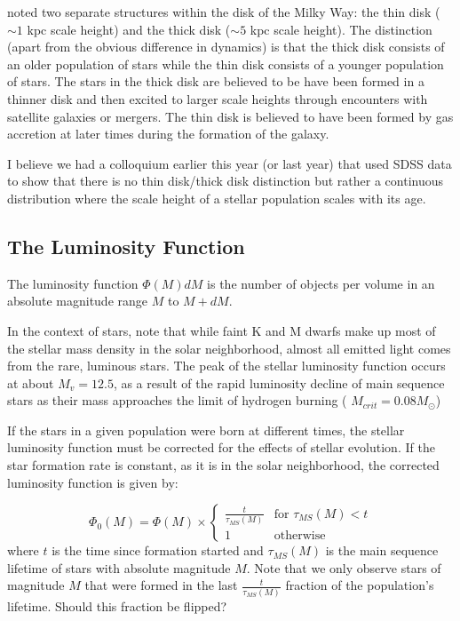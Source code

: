  noted two separate structures within the disk of the
Milky Way: the thin disk ($\sim1$ kpc scale height) and the thick disk
($\sim5$ kpc scale height).  The distinction (apart from the obvious difference in dynamics)
is that the thick disk consists of an older population of stars while the thin disk consists
of a younger population of stars.
The stars in the thick disk are believed to be have been formed in a thinner disk and then
excited to larger scale heights through encounters with satellite galaxies or mergers.
The thin disk is believed to have been formed by gas
accretion at later times during the formation of the galaxy.

I believe we had a colloquium earlier this year (or last year) that used SDSS data to show
that there is no thin disk/thick disk distinction but rather a continuous distribution
where the scale height of a stellar population scales with its age.

\subsection{The Luminosity Function}

The luminosity function $\Phi(M)dM$ is the number of objects per volume in an absolute magnitude range $M$ to $M+dM$. 

In the context of stars, note that while faint K and M dwarfs make up most of
the stellar mass density in the solar neighborhood, almost all emitted light
comes from the rare, luminous stars.
The peak of the stellar luminosity function occurs at about $M_v = 12.5$, as a result of the rapid luminosity decline of main sequence stars as their mass approaches the limit of hydrogen burning ( $M_{crit} = 0.08 M_\odot$)

If the stars in a given population were born at different times, the stellar luminosity function must be corrected for the effects of stellar evolution. If the star formation rate is constant, as it is in the solar neighborhood,  the corrected luminosity function is given by:

 \begin{equation}
\Phi_0(M) = \Phi(M) \times
\begin{cases}
\frac{t}{\tau_{MS}(M)} & \text{for } \tau_{MS}(M)<t \\
1 & \text{otherwise}
\end{cases}
\end{equation} 
where $t$ is the time since formation started and $\tau_{MS}(M)$ is the main
sequence lifetime of stars with absolute magnitude $M$. Note that we only
observe stars of magnitude $M$ that were formed in the last
$\frac{t}{\tau_{MS}(M)}$ fraction of the population's lifetime.  Should this 
fraction be flipped?

